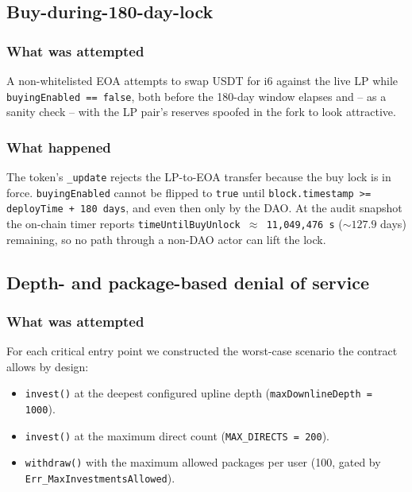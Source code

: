 \documentclass[11pt,a4paper]{article}
\begin{document}
\subsection{Buy-during-180-day-lock}

\subsubsection*{What was attempted}

A non-whitelisted EOA attempts to swap USDT for i6 against the live LP
while \texttt{buyingEnabled == false}, both before the 180-day window
elapses and -- as a sanity check -- with the LP pair's reserves spoofed in
the fork to look attractive.

\subsubsection*{What happened}

The token's \texttt{\_update} rejects the LP-to-EOA transfer because the
buy lock is in force. \texttt{buyingEnabled} cannot be flipped to
\texttt{true} until \texttt{block.timestamp >= deployTime + 180 days}, and
even then only by the DAO. At the audit snapshot the on-chain timer reports
\texttt{timeUntilBuyUnlock $\approx$ 11{,}049{,}476 s} (${\sim}127.9$ days)
remaining, so no path through a non-DAO actor can lift the lock.

\subsection{Depth- and package-based denial of service}

\subsubsection*{What was attempted}

For each critical entry point we constructed the worst-case scenario the
contract allows by design:

\begin{itemize}[leftmargin=*]
    \item \texttt{invest()} at the deepest configured upline depth
          (\texttt{maxDownlineDepth = 1000}).
    \item \texttt{invest()} at the maximum direct count
          (\texttt{MAX\_DIRECTS = 200}).
    \item \texttt{withdraw()} with the maximum allowed packages per user
          (100, gated by \texttt{Err\_MaxInvestmentsAllowed}).
\end{itemize}
\end{document}
